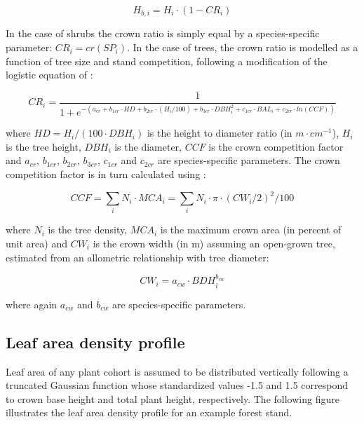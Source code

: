 \documentclass[]{book}
\begin{document}
\begin{equation}
H_{b,i} = H_{i} \cdot (1 - CR_i)
\label{eq:CrownHeight}
\end{equation}

In the case of shrubs the crown ratio is simply equal by a
species-specific parameter: \(CR_i = cr(SP_i)\). In the case of trees,
the crown ratio is modelled as a function of tree size and stand
competition, following a modification of the logistic equation of
\citet{Hasenauer1996}:

\begin{equation}
CR_i = \frac{1}{1+e^{-(a_{cr}+b_{1cr}\cdot HD +b_{2cr} \cdot (H_i/100)+b_{3cr} \cdot DBH_i^2+c_{1cr} \cdot BAL_i + c_{2cr} \cdot ln(CCF))}}
\label{eq:treecrownratio}
\end{equation}

where \(HD = H_i/(100\cdot DBH_i)\) is the height to diameter ratio (in
\(m\cdot cm^{-1}\)), \(H_i\) is the tree height, \(DBH_i\) is the
diameter, \(CCF\) is the crown competition factor and \(a_{cr}\),
\(b_{1cr}\), \(b_{2cr}\), \(b_{3cr}\), \(c_{1cr}\) and \(c_{2cr}\) are
species-specific parameters. The crown competition factor is in turn
calculated using \citep{Krajicek1961}:

\begin{equation}
CCF = \sum_{i}{N_i \cdot MCA_i}= \sum_{i}{N_i \cdot \pi \cdot (CW_i/2)^2/100}
\end{equation}

where \(N_i\) is the tree density, \(MCA_i\) is the maximum crown area
(in percent of unit area) and \(CW_i\) is the crown width (in m)
assuming an open-grown tree, estimated from an allometric relationship
with tree diameter:

\begin{equation}
CW_i = a_{cw}\cdot BDH_i^{b_{cw}} 
\end{equation}

where again \(a_{cw}\) and \(b_{cw}\) are species-specific parameters.

\subsection{Leaf area density profile}\label{ladprofile}

Leaf area of any plant cohort is assumed to be distributed vertically
following a truncated Gaussian function whose standardized values -1.5
and 1.5 correspond to crown base height and total plant height,
respectively. The following figure illustrates the leaf area density
profile for an example forest stand.
\end{document}
